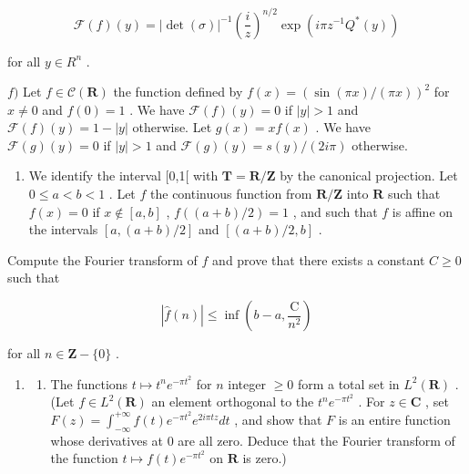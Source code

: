\[
\mathscr {F} (f) (y) = | \det (\sigma) | ^ {- 1} \left(\frac {i}{z}\right) ^ {n / 2} \exp (i \pi z ^ {- 1} Q ^ {*} (y))
\]

for all \(y \in R^{n}\) .

\(f)\) Let \(f \in \mathcal{C}(\mathbf{R})\) the function defined by \(f(x) = (\sin(\pi x)/(\pi x))^2\) for \(x \neq 0\) and \(f(0) = 1\) . We have \(\mathcal{F}(f)(y) = 0\) if \(|y| > 1\) and \(\mathcal{F}(f)(y) = 1 - |y|\) otherwise. Let \(g(x) = xf(x)\) . We have \(\mathcal{F}(g)(y) = 0\) if \(|y| > 1\) and \(\mathcal{F}(g)(y) = s(y)/(2i\pi)\) otherwise.

\begin{enumerate}
\def\labelenumi{\arabic{enumi})}
\setcounter{enumi}{1}
\tightlist
\item
  We identify the interval {[}0,1{[} with \(\mathbf{T} = \mathbf{R} / \mathbf{Z}\) by the canonical projection. Let \(0 \leqslant a < b < 1\) . Let \(f\) the continuous function from \(\mathbf{R} / \mathbf{Z}\) into \(\mathbf{R}\) such that \(f(x) = 0\) if \(x \notin [a,b]\) , \(f((a + b) / 2) = 1\) , and such that \(f\) is affine on the intervals \([a, (a + b) / 2]\) and \([(a + b) / 2, b]\) .
\end{enumerate}

Compute the Fourier transform of \(f\) and prove that there exists a constant \(C \geqslant 0\) such that

\[
| \widehat {f} (n) | \leqslant \inf \left(b - a, \frac {\mathrm{C}}{n ^ {2}}\right)
\]

for all \(n \in \mathbf{Z} - \{0\}\) .

\begin{enumerate}
\def\labelenumi{\arabic{enumi})}
\setcounter{enumi}{2}
\tightlist
\item
  \begin{enumerate}
  \def\labelenumii{\alph{enumii})}
  \tightlist
  \item
    The functions \(t \mapsto t^n e^{-\pi t^2}\) for \(n\) integer \(\geqslant 0\) form a total set in \(L^2(\mathbf{R})\) . (Let \(f \in L^2(\mathbf{R})\) an element orthogonal to the \(t^n e^{-\pi t^2}\) . For \(z \in \mathbf{C}\) , set \(F(z) = \int_{-\infty}^{+\infty} f(t)e^{-\pi t^2}e^{2i\pi tz}dt\) , and show that \(F\) is an entire function whose derivatives at 0 are all zero. Deduce that the Fourier transform of the function \(t \mapsto f(t)e^{-\pi t^2}\) on \(\mathbf{R}\) is zero.)
  \end{enumerate}
\end{enumerate}

